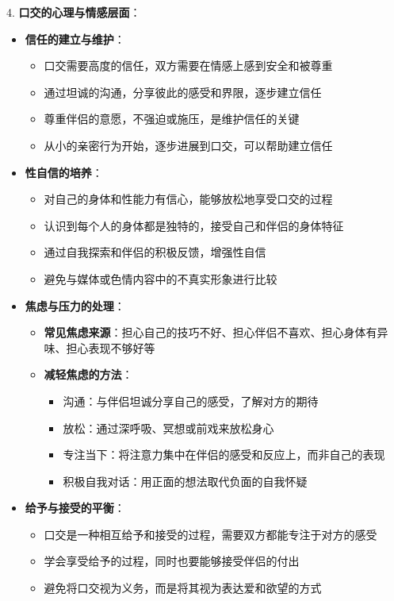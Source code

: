 \documentclass[12pt,UTF8]{ctexbook}
\begin{document}
4. \textbf{口交的心理与情感层面}：
  \begin{itemize}
  \item \textbf{信任的建立与维护}：
    \begin{itemize}
    \item 口交需要高度的信任，双方需要在情感上感到安全和被尊重
    \item 通过坦诚的沟通，分享彼此的感受和界限，逐步建立信任
    \item 尊重伴侣的意愿，不强迫或施压，是维护信任的关键
    \item 从小的亲密行为开始，逐步进展到口交，可以帮助建立信任
    \end{itemize}
  \item \textbf{性自信的培养}：
    \begin{itemize}
    \item 对自己的身体和性能力有信心，能够放松地享受口交的过程
    \item 认识到每个人的身体都是独特的，接受自己和伴侣的身体特征
    \item 通过自我探索和伴侣的积极反馈，增强性自信
    \item 避免与媒体或色情内容中的不真实形象进行比较
    \end{itemize}
  \item \textbf{焦虑与压力的处理}：
    \begin{itemize}
    \item \textbf{常见焦虑来源}：担心自己的技巧不好、担心伴侣不喜欢、担心身体有异味、担心表现不够好等
    \item \textbf{减轻焦虑的方法}：
      \begin{itemize}
      \item 沟通：与伴侣坦诚分享自己的感受，了解对方的期待
      \item 放松：通过深呼吸、冥想或前戏来放松身心
      \item 专注当下：将注意力集中在伴侣的感受和反应上，而非自己的表现
      \item 积极自我对话：用正面的想法取代负面的自我怀疑
      \end{itemize}
    \end{itemize}
  \item \textbf{给予与接受的平衡}：
    \begin{itemize}
    \item 口交是一种相互给予和接受的过程，需要双方都能专注于对方的感受
    \item 学会享受给予的过程，同时也要能够接受伴侣的付出
    \item 避免将口交视为义务，而是将其视为表达爱和欲望的方式

\end{itemize}
\end{itemize}
\end{document}

